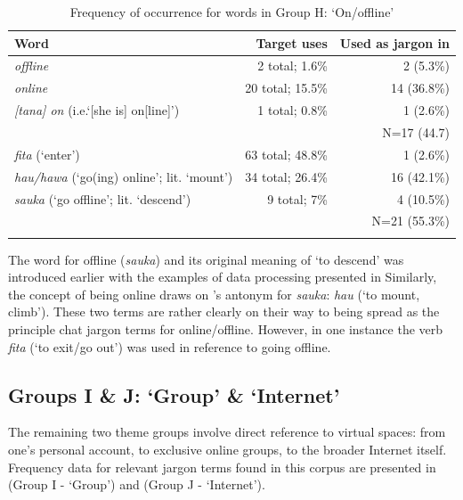 \documentclass[output=paper
,newtxmath
,modfonts
,nonflat]{langsci/langscibook}
\begin{document}
\begin{table}
\begin{tabularx}{\textwidth}{Qrr}
\lsptoprule
Word & Target uses & Used as jargon in \\
\midrule
\textit{offline}                             & 2 total; 1.6\% & 2 (5.3\%)\\
\textit{online}                              & 20 total; 15.5\% & 14 (36.8\%)\\
\textit{[tana] on} (i.e.‘[she is] on[line]’) & 1 total; 0.8\% & 1 (2.6\%)\\\midrule
& & N=17 (44.7)\\\midrule
\textit{fita} (‘enter’)                            & 63 total; 48.8\% & 1 (2.6\%)\\
\textit{hau/hawa} (‘go(ing) online’; lit. ‘mount’) & 34 total; 26.4\% & 16 (42.1\%)\\
\textit{sauka} (‘go offline’; lit. ‘descend’)      & 9 total; 7\% & 4 (10.5\%)\\\midrule
& & N=21 (55.3\%)\\
\lspbottomrule
\end{tabularx}
\caption{Frequency of occurrence for words in Group H: ‘On/offline’}
\label{tab:purvis:10}
\end{table} 

The word for offline (\textit{sauka}) and its original meaning of ‘to descend’ was introduced earlier with the examples of data processing presented in  Similarly, the concept of being online draws on ’s antonym for \textit{sauka}: \textit{hau} (‘to mount, climb’). These two terms are rather clearly on their way to being spread as the principle  chat jargon terms for online/offline. However, in one instance the verb \textit{fita} (‘to exit/go out’) was used in reference to going offline.

\subsection{Groups I \& J: ‘Group’ \& ‘Internet’}

The remaining two theme groups involve direct reference to virtual spaces: from one’s personal account, to exclusive online groups, to the broader Internet itself. Frequency data for relevant jargon terms found in this corpus are presented in  (Group I - ‘Group’) and  (Group J - ‘Internet’).
\end{document}
